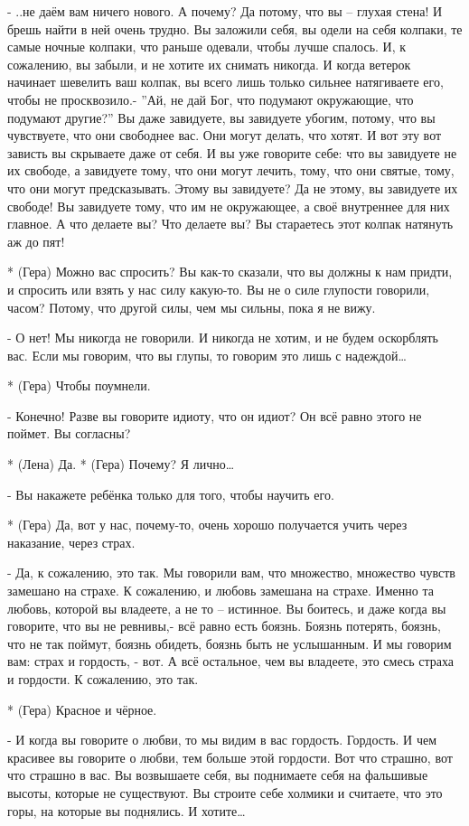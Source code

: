 - ..не даём вам ничего нового. А почему? Да потому, что вы – глухая стена! И брешь найти в ней очень трудно. Вы заложили себя, вы одели на себя колпаки, те самые ночные колпаки, что раньше одевали, чтобы лучше спалось. И, к сожалению, вы забыли, и не хотите их снимать никогда. И когда ветерок начинает шевелить ваш колпак, вы всего лишь только сильнее натягиваете его, чтобы не просквозило.- ”Ай,  не дай Бог, что подумают окружающие, что подумают другие?”  Вы даже завидуете, вы завидуете убогим, потому, что вы чувствуете, что они свободнее вас. Они могут делать, что хотят. И вот эту вот зависть вы скрываете даже от себя. И вы уже говорите себе: что вы завидуете не их свободе, а завидуете тому, что они могут лечить, тому, что они святые, тому, что они могут предсказывать. Этому вы завидуете? Да не этому, вы завидуете их свободе! Вы завидуете тому, что им не окружающее, а своё внутреннее для них главное. А что делаете вы? Что делаете вы? Вы стараетесь этот колпак натянуть аж до пят!

* (Гера) Можно вас спросить? Вы как-то сказали, что вы должны к нам придти, и спросить или взять у нас силу какую-то. Вы не о силе глупости говорили, часом? Потому, что другой силы, чем мы сильны, пока я не вижу.

- О нет! Мы никогда не говорили. И никогда не хотим, и не будем оскорблять вас. Если мы говорим, что вы глупы, то говорим это лишь с надеждой…

* (Гера) Чтобы поумнели.

- Конечно! Разве вы говорите идиоту, что он идиот? Он всё равно этого не поймет. Вы согласны? 

* (Лена) Да.
* (Гера) Почему? Я лично…

- Вы накажете ребёнка только для того, чтобы научить его.

* (Гера) Да, вот у нас, почему-то, очень хорошо получается учить через наказание, через страх.

- Да, к сожалению, это так. Мы говорили вам, что множество, множество чувств замешано на страхе. К сожалению, и любовь замешана на страхе. Именно та любовь, которой вы владеете, а не то – истинное. Вы боитесь, и даже когда вы говорите, что вы не ревнивы,- всё равно есть боязнь. Боязнь потерять, боязнь, что не так поймут, боязнь обидеть, боязнь быть не услышанным. И мы говорим вам: страх и гордость, - вот. А всё остальное, чем вы владеете, это смесь страха и гордости. К сожалению, это так. 

* (Гера) Красное и чёрное.

- И когда вы говорите о любви, то мы видим в вас гордость. Гордость. И чем красивее вы говорите о любви, тем больше этой гордости. Вот что страшно, вот что страшно в вас. Вы возвышаете себя, вы поднимаете себя на фальшивые высоты, которые не существуют. Вы строите себе холмики и считаете, что это горы, на которые вы поднялись. И хотите… 

